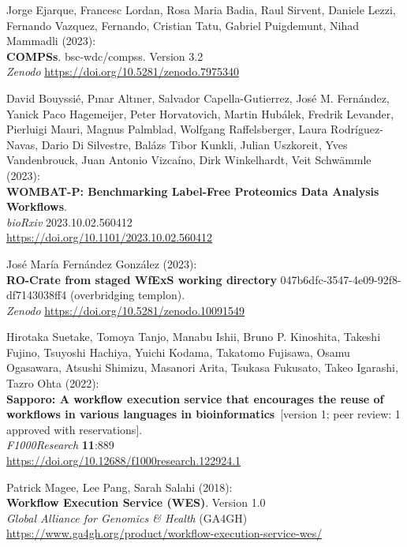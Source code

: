 \documentclass[10pt,letterpaper]{article}
\begin{document}
\begin{thebibliography}{10}
\begin{small}
Jorge Ejarque, Francesc Lordan, Rosa Maria Badia, Raul Sirvent, Daniele Lezzi, Fernando Vazquez, Fernando, Cristian Tatu,  Gabriel Puigdemunt, Nihad Mammadli (2023):\\
\textbf{COMPSs}. bsc-wdc/compss. Version 3.2\\
\emph{Zenodo}
\url{https://doi.org/10.5281/zenodo.7975340}



David Bouyssié, Pınar Altıner, Salvador Capella-Gutierrez, José M. Fernández, Yanick Paco Hagemeijer, Peter Horvatovich, Martin Hubálek, Fredrik Levander, Pierluigi Mauri, Magnus Palmblad, Wolfgang Raffelsberger, Laura Rodríguez-Navas, Dario Di Silvestre, Balázs Tibor Kunkli, Julian Uszkoreit, Yves Vandenbrouck, Juan Antonio Vizcaíno, Dirk Winkelhardt, Veit Schwämmle (2023):\\
\textbf{WOMBAT-P: Benchmarking Label-Free Proteomics Data Analysis Workflows}.\\
\emph{bioRxiv} 2023.10.02.560412 \\
\url{https://doi.org/10.1101/2023.10.02.560412}

José María Fernández González (2023):\\
\textbf{RO-Crate from staged WfExS working directory} 047b6dfc-3547-4e09-92f8-df7143038ff4 (overbridging templon).\\
\emph{Zenodo}
\url{https://doi.org/10.5281/zenodo.10091549}

 Hirotaka Suetake, Tomoya Tanjo, Manabu Ishii, Bruno
P. Kinoshita, Takeshi Fujino, Tsuyoshi Hachiya, Yuichi Kodama, Takatomo
Fujisawa, Osamu Ogasawara, Atsushi Shimizu, Masanori Arita, Tsukasa
Fukusato, Takeo Igarashi, Tazro Ohta (2022):\\
\textbf{Sapporo: A workflow execution service that encourages the reuse
of workflows in various languages in bioinformatics}~[version 1; peer review: 1 approved with reservations].\\
\emph{F1000Research} \textbf{11}:889\\
\url{https://doi.org/10.12688/f1000research.122924.1}

Patrick Magee, Lee Pang, Sarah Salahi (2018):\\
\textbf{Workflow Execution Service (WES)}. Version 1.0\\
\emph{Global Alliance for Genomics \& Health} (GA4GH)\\
\url{https://www.ga4gh.org/product/workflow-execution-service-wes/}


\end{small}
\end{thebibliography}
\end{document}
